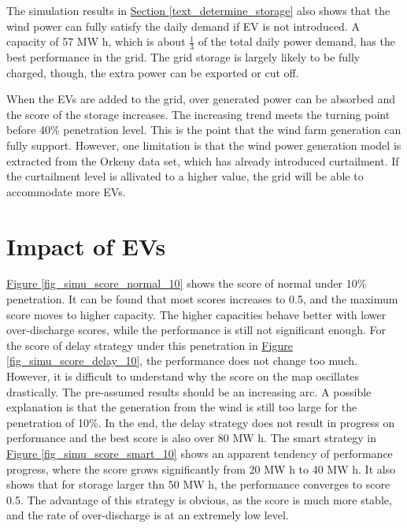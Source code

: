 \documentclass[12pt,a4paper]{report}
\begin{document}
        The simulation results in \hyperref[text_determine_storage]{Section \ref*{text_determine_storage}} also shows that the wind power can fully satisfy the daily demand if EV is not introduced. A capacity of 57 MW h, which is about $\frac{1}{3}$ of the total daily power demand, has the best performance in the grid.
        The grid storage is largely likely to be fully charged, though, the extra power can be exported or cut off. 
        
        When the EVs are added to the grid, over generated power can be absorbed and the score of the storage increases. The increasing trend meets the turning point before 40\% penetration level. This is the point that the wind farm generation can fully support. However, one limitation is that the wind power generation model is extracted from the Orkeny data set, which has already introduced curtailment. If the curtailment level is allivated to a higher value, the grid will be able to accommodate more EVs.

        \section{Impact of EVs}

        \hyperref[fig_simu_score_normal_10]{Figure \ref*{fig_simu_score_normal_10}} shows the score of normal under 10\% penetration. It can be found that most scores increases to 0.5, and the maximum score moves to higher capacity. The higher capacities behave better with lower over-discharge scores, while the performance is still not significant enough.
        For the score of delay strategy under this penetration in \hyperref[fig_simu_score_delay_10]{Figure \ref*{fig_simu_score_delay_10}}, the performance does not change too much. However, it is difficult to understand why the score on the map oscillates drastically. The pre-assumed results should be an increasing arc. A possible explanation is that the generation from the wind is still too large for the penetration of 10\%. In the end, the delay strategy does not result in progress on performance and the best score is also over 80 MW h.
        The smart strategy in \hyperref[fig_simu_score_smart_10]{Figure \ref*{fig_simu_score_smart_10}} shows an apparent tendency of performance progress, where the score grows significantly from 20 MW h to 40 MW h. It also shows that for storage larger thn 50 MW h, the performance converges to score 0.5. The advantage of this strategy is obvious, as the score is much more stable, and the rate of over-discharge is at an extremely low level.
\end{document}
